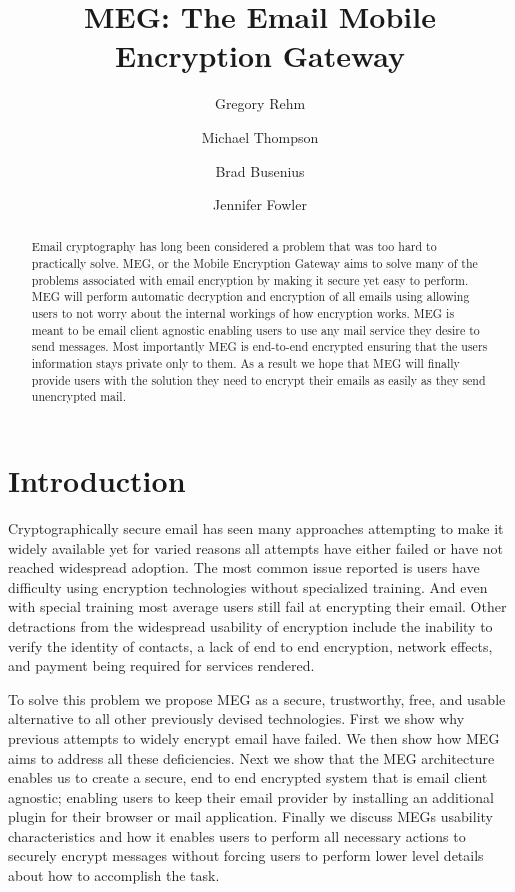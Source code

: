 \documentclass[10pt,twocolumn]{article}
\begin{document}
\title{MEG: The Email Mobile Encryption Gateway}

\author{Gregory Rehm} \author{Michael Thompson} \author{Brad Busenius} \author{Jennifer Fowler}


\maketitle

\begin{abstract}
\par Email cryptography has long been considered a problem that was too hard to practically solve. MEG, or the Mobile Encryption Gateway aims to solve many of the problems associated with email encryption by making it secure yet easy to perform. MEG will perform automatic decryption and encryption of all emails using allowing users to not worry about the internal workings of how encryption works. MEG is meant to be email client agnostic enabling users to use any mail service they desire to send messages. Most importantly MEG is end-to-end encrypted ensuring that the users information stays private only to them. As a result we hope that MEG will finally provide users with the solution they need to encrypt their emails as easily as they send unencrypted mail.
\end{abstract}
\section{Introduction}
\par Cryptographically secure email has seen many approaches attempting to make it widely available yet for varied reasons all attempts have either failed or have not reached widespread adoption. The most common issue reported is users have difficulty using encryption technologies without specialized training. And even with special training most average users still fail at encrypting their email\cite{whitten1999johnny}. Other detractions from the widespread usability of encryption include the inability to verify the identity of contacts, a lack of end to end encryption, network effects, and payment being required for services rendered.
\par To solve this problem we propose MEG as a secure, trustworthy, free, and usable alternative to all other previously devised technologies. First we show why previous attempts to widely encrypt email have failed. We then show how MEG aims to address all these deficiencies. Next we show that the MEG architecture enables us to create a secure, end to end encrypted system that is email client agnostic; enabling users to keep their email provider by installing an additional plugin for their browser or mail application. Finally we discuss MEGs usability characteristics and how it enables users to perform all necessary actions to securely encrypt messages without forcing users to perform lower level details about how to accomplish the task.
\end{document}
